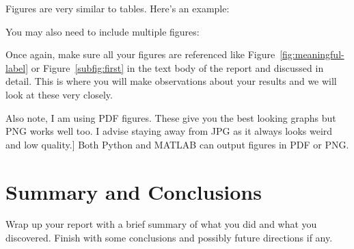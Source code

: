 \documentclass[11pt]{amsart}
\begin{document}
Figures are very similar to tables. Here's an example: 


You may also need to include multiple figures: 


Once again, make sure all your figures are referenced like Figure~\ref{fig:meaningful-label}
or Figure~\ref{subfig:first} in the text body of the report and discussed 
in detail. This is where you will make observations about your results and we will 
look at these very closely. 

Also note, I am using PDF figures. These give you the best looking graphs but PNG works 
well too. I advise staying away from JPG as it always looks weird and low quality.]
Both Python and MATLAB can output figures in PDF or PNG.

\section{Summary and Conclusions}\label{sec:conclusions}
Wrap up your report with a brief summary of what you did and what you discovered. 
Finish with some conclusions and possibly future directions if any. 
\end{document}

